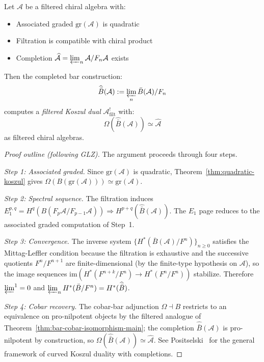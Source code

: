 \begin{theorem}\label{thm:filtered-koszul-glz}
Let $\mathcal{A}$ be a filtered chiral algebra with:
\begin{itemize}
\item Associated graded $\text{gr}(\mathcal{A})$ is quadratic
\item Filtration is compatible with chiral product
\item Completion $\widehat{\mathcal{A}} = \varprojlim_n \mathcal{A}/F_n\mathcal{A}$ exists
\end{itemize}

Then the completed bar construction:
\begin{equation}
\widehat{\bar{B}}(\mathcal{A}) := \varprojlim_n \bar{B}(\mathcal{A})/F_n
\end{equation}
computes a \emph{filtered Koszul dual} $\mathcal{A}^!_{\text{filt}}$ with:
\begin{equation}
\Omega(\widehat{\bar{B}}(\mathcal{A})) \simeq \widehat{\mathcal{A}}
\end{equation}
as filtered chiral algebras.
\end{theorem}

\begin{proof}[Proof outline (following GLZ)]
The argument proceeds through four steps.

\emph{Step 1: Associated graded.}
Since $\mathrm{gr}(\mathcal{A})$ is quadratic, Theorem~\ref{thm:quadratic-koszul} gives
$\Omega(B(\mathrm{gr}(\mathcal{A}))) \simeq \mathrm{gr}(\mathcal{A})$.

\emph{Step 2: Spectral sequence.}
The filtration induces
$E_1^{p,q} = H^q(B(F_p\mathcal{A}/F_{p-1}\mathcal{A})) \Rightarrow H^{p+q}(\widehat{\bar{B}}(\mathcal{A}))$.
The $E_1$ page reduces to the associated graded computation of Step~1.

\emph{Step 3: Convergence.}
The inverse system $\{H^*(\bar{B}(\mathcal{A})/F^n)\}_{n \geq 0}$ satisfies the Mittag-Leffler condition because the filtration is exhaustive and the successive quotients $F^n/F^{n+1}$ are finite-dimensional (by the finite-type hypothesis on $\mathcal{A}$), so the image sequences $\mathrm{im}(H^*(F^{n+k}/F^n) \to H^*(F^n/F^n))$ stabilize.  Therefore $\varprojlim^1 = 0$ and $\varprojlim_n H^*(\bar{B}/F^n) = H^*(\widehat{\bar{B}})$.

\emph{Step 4: Cobar recovery.}
The cobar-bar adjunction $\Omega \dashv B$ restricts to an equivalence on pro-nilpotent objects by the filtered analogue of Theorem~\ref{thm:bar-cobar-isomorphism-main}; the completion $\widehat{\bar{B}}(\mathcal{A})$ is pro-nilpotent by construction, so $\Omega(\widehat{\bar{B}}(\mathcal{A})) \simeq \widehat{\mathcal{A}}$.  See Positselski~\cite{Positselski11} for the general framework of curved Koszul duality with completions.
\end{proof}

